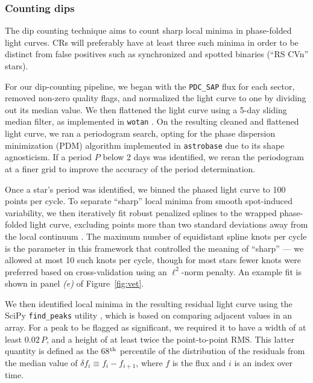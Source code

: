 \documentclass[11pt,twocolumn,tighten]{aastex63}
\begin{document}
\subsubsection{Counting dips}
\label{subsec:counting}

The dip counting technique aims to count sharp local minima in
phase-folded light curves.  CRs will preferably have at least three
such minima in order to be distinct from false positives such as
synchronized and spotted binaries (``RS CVn'' stars). 

For our dip-counting pipeline, we began with the {\tt PDC\_SAP} flux
for each sector, removed non-zero quality flags, and normalized the
light curve to one by dividing out its median value.  We then
flattened the light curve using a 5-day sliding median filter, as
implemented in \texttt{wotan} \citep{2019AJ....158..143H}.  On the
resulting cleaned and flattened light curve, we ran a periodogram
search, opting for the \citet{1978ApJ...224..953S} phase dispersion
minimization (PDM) algorithm implemented in \texttt{astrobase}
\citep{2021zndo...1011188B} due to its shape agnosticism.  If a period
$P$ below 2 days was identified, we reran the periodogram at a finer
grid to improve the accuracy of the period determination.

Once a star's period was identified, we binned the phased light curve
to 100 points per cycle.  To separate ``sharp'' local minima from
smooth spot-induced variability, we then iteratively fit
robust penalized splines to the wrapped phase-folded light curve,
excluding points more than two standard deviations away from the local
continuum \citep{2019AJ....158..143H}.  The maximum number of
equidistant spline knots per cycle is the parameter in this framework
that controlled the meaning of ``sharp'' --- we allowed at most 10
such knots per cycle, though for most stars fewer knots were preferred
based on cross-validation using an $\ell^2$-norm penalty.  An example
fit is shown in panel {\it (e)} of Figure~\ref{fig:vet}.

We then identified local minima in the resulting residual light curve
using the SciPy \texttt{find\_peaks} utility
\citep{2020NatMe..17..261V}, which is based on comparing adjacent
values in an array.  For a peak to be flagged as significant, we
required it to have a width of at least $0.02\,P$, and a height of at
least twice the point-to-point RMS.  This latter quantity is defined
as the 68$^{\rm th}$ percentile of the distribution of the residuals
from the median value of $\delta f_i \equiv f_i - f_{i+1}$, where $f$
is the flux and $i$ is an index over time.
\end{document}
